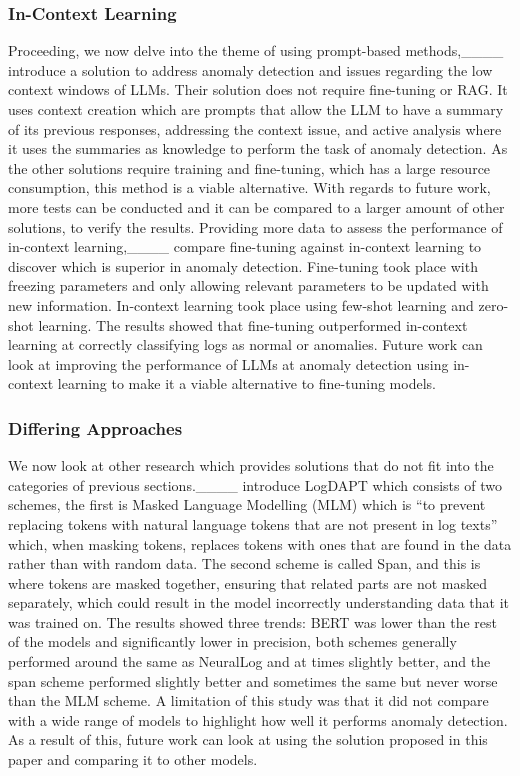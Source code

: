 \subsubsection{In-Context Learning}
Proceeding, we now delve into the theme of using prompt-based methods,____ introduce a solution to address anomaly detection and issues regarding the low context windows of LLMs. Their solution does not require fine-tuning or RAG. It uses context creation which are prompts that allow the LLM to have a summary of its previous responses, addressing the context issue, and active analysis where it uses the summaries as knowledge to perform the task of anomaly detection. As the other solutions require training and fine-tuning, which has a large resource consumption, this method is a viable alternative. With regards to future work, more tests can be conducted and it can be compared to a larger amount of other solutions, to verify the results. Providing more data to assess the performance of in-context learning,____ compare fine-tuning against in-context learning to discover which is superior in anomaly detection. Fine-tuning took place with freezing parameters and only allowing relevant parameters to be updated with new information. In-context learning took place using few-shot learning and zero-shot learning. The results showed that fine-tuning outperformed in-context learning at correctly classifying logs as normal or anomalies. Future work can look at improving the performance of LLMs at anomaly detection using in-context learning to make it a viable alternative to fine-tuning models. 

\subsubsection{Differing Approaches}
We now look at other research which provides solutions that do not fit into the categories of previous sections.____ introduce LogDAPT which consists of two schemes, the first is Masked Language Modelling (MLM) which is ``to prevent replacing tokens with natural language tokens that are not present in log texts'' which, when masking tokens, replaces tokens with ones that are found in the data rather than with random data. The second scheme is called Span, and this is where tokens are masked together, ensuring that related parts are not masked separately, which could result in the model incorrectly understanding data that it was trained on. The results showed three trends: BERT was lower than the rest of the models and significantly lower in precision, both schemes generally performed around the same as NeuralLog and at times slightly better, and the span scheme performed slightly better and sometimes the same but never worse than the MLM scheme.  A limitation of this study was that it did not compare with a wide range of models to highlight how well it performs anomaly detection. As a result of this, future work can look at using the solution proposed in this paper and comparing it to other models.

